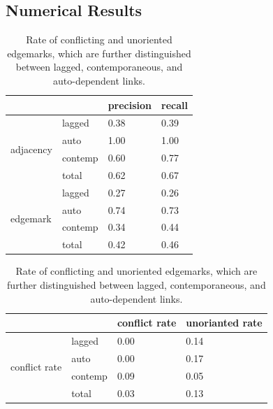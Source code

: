 \documentclass[conference]{IEEEtran}
\begin{document}
\subsection{Numerical Results}
\begin{table}[!htb]
    \caption{Numerical results}
    \begin{minipage}{.5\linewidth}
        \caption[]{precision and recall of edgemarks and adjacencies, which are further distinguished between lagged, contemporaneous, and auto-dependent links.}
      \centering
        \begin{tabular}{@{}llll@{}}
            \toprule
            \textbf{}                  &         & precision      & recall  \\ \midrule
            \multirow{4}{*}{adjacency} & lagged  & 0.38             & 0.39       \\
                                       & auto    & 1.00             & 1.00       \\
                                       & contemp & 0.60             & 0.77       \\
                                       & total   & 0.62             & 0.67       \\ \midrule
            \multirow{4}{*}{edgemark}  & lagged  & 0.27             & 0.26        \\
                                       & auto    & 0.74             & 0.73       \\
                                       & contemp & 0.34             & 0.44       \\
                                       & total   & 0.42             & 0.46       \\ \bottomrule
            \end{tabular}
            \label{tab:precision_recall}
    \end{minipage}%
    \begin{minipage}{.5\linewidth}
      \centering
            \caption[]{Rate of conflicting and unoriented edgemarks, which are further distinguished between lagged, contemporaneous, and auto-dependent links.}
            \begin{tabular}{@{}llll@{}}
            \toprule
            \textbf{}                        &         & conflict rate    & unorianted rate  \\ \midrule
            \multirow{4}{*}{conflict rate}   & lagged  & 0.00               & 0.14                \\
                                             & auto    & 0.00               & 0.17                \\
                                             & contemp & 0.09               & 0.05                \\
                                             & total   & 0.03               & 0.13       \\ \bottomrule
            \end{tabular}
            \label{tab:conflict_unoriented}
    \end{minipage} 
\end{table}
\end{document}
